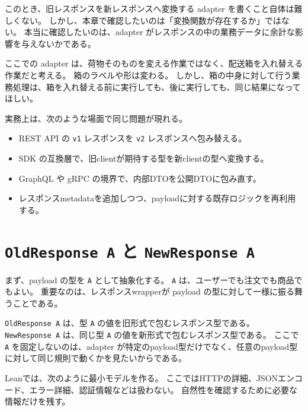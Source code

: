 このとき、旧レスポンスを新レスポンスへ変換する adapter を書くこと自体は難しくない。
しかし、本章で確認したいのは「変換関数が存在するか」ではない。
本当に確認したいのは、adapter がレスポンスの中の業務データに余計な影響を与えないかである。

\begin{intuitionbox}
ここでの adapter は、荷物そのものを変える作業ではなく、配送箱を入れ替える作業だと考える。
箱のラベルや形は変わる。
しかし、箱の中身に対して行う業務処理は、箱を入れ替える前に実行しても、後に実行しても、同じ結果になってほしい。
\end{intuitionbox}


\begin{softwarebox}
実務上は、次のような場面で同じ問題が現れる。
\begin{itemize}
\item REST API の \texttt{v1} レスポンスを \texttt{v2} レスポンスへ包み替える。
\item SDK の互換層で、旧clientが期待する型を新clientの型へ変換する。
\item GraphQL や gRPC の境界で、内部DTOを公開DTOに包み直す。
\item レスポンスmetadataを追加しつつ、payloadに対する既存ロジックを再利用する。
\end{itemize}
\end{softwarebox}

\section{\texttt{OldResponse A} と \texttt{NewResponse A}}

まず、payload の型を \texttt{A} として抽象化する。
\texttt{A} は、ユーザーでも注文でも商品でもよい。
重要なのは、レスポンスwrapperが payload の型に対して一様に振る舞うことである。

\begin{definitionbox}
\texttt{OldResponse A} は、型 \texttt{A} の値を旧形式で包むレスポンス型である。
\texttt{NewResponse A} は、同じ型 \texttt{A} の値を新形式で包むレスポンス型である。
ここで \texttt{A} を固定しないのは、adapter が特定のpayload型だけでなく、任意のpayload型に対して同じ規則で動くかを見たいからである。
\end{definitionbox}

Leanでは、次のように最小モデルを作る。
ここではHTTPの詳細、JSONエンコード、エラー詳細、認証情報などは扱わない。
自然性を確認するために必要な情報だけを残す。

